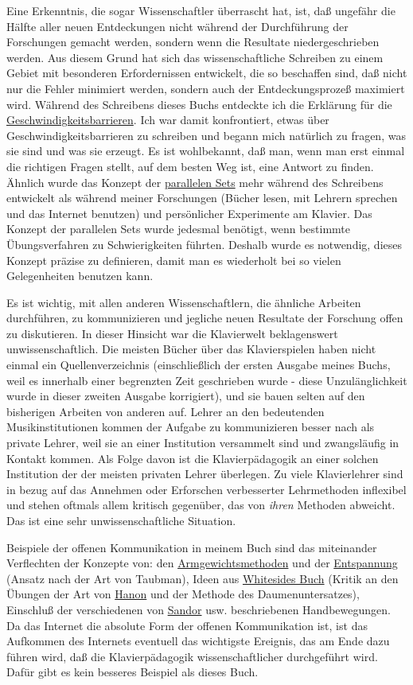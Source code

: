 Eine Erkenntnis, die sogar Wissenschaftler überrascht hat, ist, daß ungefähr die Hälfte aller neuen Entdeckungen nicht während der Durchführung der Forschungen gemacht werden, sondern wenn die Resultate niedergeschrieben werden.
Aus diesem Grund hat sich das wissenschaftliche Schreiben zu einem Gebiet mit besonderen Erfordernissen entwickelt, die so beschaffen sind, daß nicht nur die Fehler minimiert werden, sondern auch der Entdeckungsprozeß maximiert wird.
Während des Schreibens dieses Buchs entdeckte ich die Erklärung für die \hyperref[c1iv2b]{Geschwindigkeitsbarrieren}.
Ich war damit konfrontiert, etwas über Geschwindigkeitsbarrieren zu schreiben und begann mich natürlich zu fragen, was sie sind und was sie erzeugt.
Es ist wohlbekannt, daß man, wenn man erst einmal die richtigen Fragen stellt, auf dem besten Weg ist, eine Antwort zu finden.
Ähnlich wurde das Konzept der \hyperref[c1iii7b]{parallelen Sets} mehr während des Schreibens entwickelt als während meiner Forschungen (Bücher lesen, mit Lehrern sprechen und das Internet benutzen) und persönlicher Experimente am Klavier.
Das Konzept der parallelen Sets wurde jedesmal benötigt, wenn bestimmte Übungsverfahren zu Schwierigkeiten führten.
Deshalb wurde es notwendig, dieses Konzept präzise zu definieren, damit man es wiederholt bei so vielen Gelegenheiten benutzen kann.

Es ist wichtig, mit allen anderen Wissenschaftlern, die ähnliche Arbeiten durchführen, zu kommunizieren und jegliche neuen Resultate der Forschung offen zu diskutieren.
In dieser Hinsicht war die Klavierwelt beklagenswert unwissenschaftlich.
Die meisten Bücher über das Klavierspielen haben nicht einmal ein Quellenverzeichnis (einschließlich der ersten Ausgabe meines Buchs, weil es innerhalb einer begrenzten Zeit geschrieben wurde - diese Unzulänglichkeit wurde in dieser zweiten Ausgabe korrigiert), und sie bauen selten auf den bisherigen Arbeiten von anderen auf.
Lehrer an den bedeutenden Musikinstitutionen kommen der Aufgabe zu kommunizieren besser nach als private Lehrer, weil sie an einer Institution versammelt sind und zwangsläufig in Kontakt kommen.
Als Folge davon ist die Klavierpädagogik an einer solchen Institution der der meisten privaten Lehrer überlegen.
Zu viele Klavierlehrer sind in bezug auf das Annehmen oder Erforschen verbesserter Lehrmethoden inflexibel und stehen oftmals allem kritisch gegenüber, das von \textit{ihren} Methoden abweicht.
Das ist eine sehr unwissenschaftliche Situation.

Beispiele der offenen Kommunikation in meinem Buch sind das miteinander Verflechten der Konzepte von: den \hyperref[c1ii10]{Armgewichtsmethoden} und der \hyperref[c1ii14]{Entspannung} (Ansatz nach der Art von Taubman), Ideen aus \hyperref[Whiteside]{Whitesides Buch} (Kritik an den Übungen der Art von \hyperref[c1iii7h]{Hanon} und der Methode des Daumenuntersatzes), Einschluß der verschiedenen von \hyperref[Sandor]{Sandor} usw. beschriebenen Handbewegungen.
Da das Internet die absolute Form der offenen Kommunikation ist, ist das Aufkommen des Internets eventuell das wichtigste Ereignis, das am Ende dazu führen wird, daß die Klavierpädagogik wissenschaftlicher durchgeführt wird.
Dafür gibt es kein besseres Beispiel als dieses Buch.

